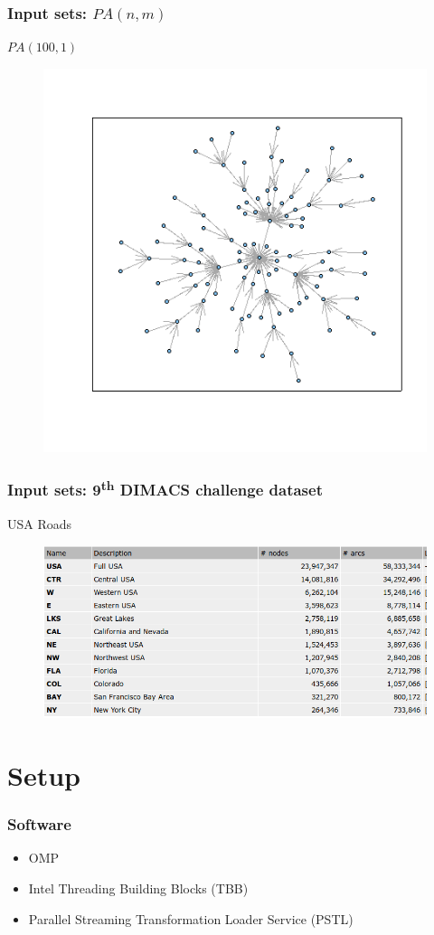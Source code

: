 \documentclass{beamer}
\begin{document}
\begin{frame}
\frametitle{Input sets: $PA(n, m)$}
\centering
$PA(100, 1)$
\begin{figure}
 \includegraphics[width=.7\textwidth]{graphPA.png}
\end{figure}
\end{frame}

\begin{frame}
\frametitle{Input sets: 9\textsuperscript{th} DIMACS challenge dataset}
\centering
USA Roads
\begin{figure}
 \includegraphics[width=.7\textwidth]{graphUSA.png}
\end{figure}
\end{frame}


\section{Setup}

\begin{frame}
\frametitle{Software}
\centering

\begin{itemize}
\item OMP
\item Intel Threading Building Blocks (TBB)
\item Parallel Streaming Transformation Loader Service (PSTL)
\end{itemize}

\end{frame}
\end{document}
